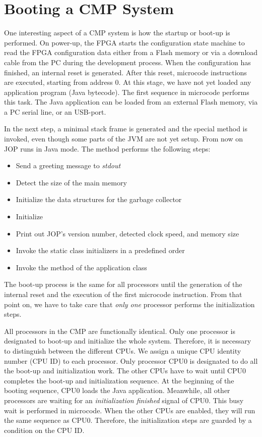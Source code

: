 \section{Booting a CMP System}


One interesting aspect of a CMP system is how the startup or boot-up
is performed. On power-up, the FPGA starts the configuration state
machine to read the FPGA configuration data either from a Flash
memory or via a download cable from the PC during the development
process. When the configuration has finished, an internal reset is
generated. After this reset, microcode instructions are executed,
starting from address 0. At this stage, we have not yet loaded any
application program (Java bytecode). The first sequence in microcode
performs this task. The Java application can be loaded from an
external Flash memory, via a PC serial line, or an USB-port.

In the next step, a minimal stack frame is generated and the special
method  is invoked, even though some parts of
the JVM are not yet setup. From now on JOP runs in Java mode. The
method  performs the following steps:
\begin{samepage}
\begin{itemize}
    \item Send a greeting message to \emph{stdout}
    \item Detect the size of the main memory
    \item Initialize the data structures for the garbage
        collector
    \item Initialize 
    \item Print out JOP's version number, detected clock speed,
        and memory size
    \item Invoke the static class initializers in a predefined
        order
    \item Invoke the  method of the application class
\end{itemize}
\end{samepage}

The boot-up process is the same for all processors until the
generation of the internal reset and the execution of the first
microcode instruction. From that point on, we have to take care that
\emph{only one} processor performs the initialization steps.

All processors in the CMP are functionally identical. Only one
processor is designated to boot-up and initialize the whole system.
Therefore, it is necessary to distinguish between the different CPUs.
We assign a unique CPU identity number (CPU ID) to each processor.
Only processor CPU0 is designated to do all the boot-up and
initialization work. The other CPUs have to wait until CPU0 completes
the boot-up and initialization sequence. At the beginning of the
booting sequence, CPU0 loads the Java application. Meanwhile, all
other processors are waiting for an \emph{initialization finished}
signal of CPU0. This busy wait is performed in microcode. When the
other CPUs are enabled, they will run the same sequence as CPU0.
Therefore, the initialization steps are guarded by a condition on the
CPU ID.

